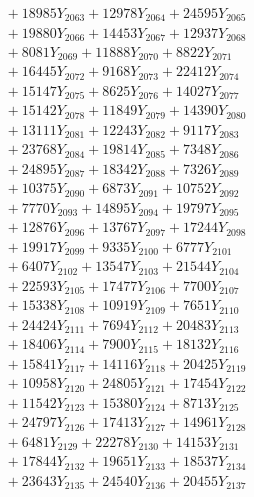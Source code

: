 \documentclass[a4paper,10pt]{article}
\begin{document}
{\begin{align}
&\;  + 18985 Y_{2063} + 12978 Y_{2064} + 24595 Y_{2065} \\[0.3ex]
&\;  + 19880 Y_{2066} + 14453 Y_{2067} + 12937 Y_{2068} \\[0.5ex]\allowbreak
&\;  + 8081 Y_{2069} + 11888 Y_{2070} + 8822 Y_{2071} \\[0.3ex]
&\;  + 16445 Y_{2072} + 9168 Y_{2073} + 22412 Y_{2074} \\[0.3ex]
&\;  + 15147 Y_{2075} + 8625 Y_{2076} + 14027 Y_{2077} \\[0.3ex]
&\;  + 15142 Y_{2078} + 11849 Y_{2079} + 14390 Y_{2080} \\[0.3ex]
&\;  + 13111 Y_{2081} + 12243 Y_{2082} + 9117 Y_{2083} \\[0.3ex]
&\;  + 23768 Y_{2084} + 19814 Y_{2085} + 7348 Y_{2086} \\[0.3ex]
&\;  + 24895 Y_{2087} + 18342 Y_{2088} + 7326 Y_{2089} \\[0.3ex]
&\;  + 10375 Y_{2090} + 6873 Y_{2091} + 10752 Y_{2092} \\[0.3ex]
&\;  + 7770 Y_{2093} + 14895 Y_{2094} + 19797 Y_{2095} \\[0.3ex]
&\;  + 12876 Y_{2096} + 13767 Y_{2097} + 17244 Y_{2098} \\[0.5ex]\allowbreak
&\;  + 19917 Y_{2099} + 9335 Y_{2100} + 6777 Y_{2101} \\[0.3ex]
&\;  + 6407 Y_{2102} + 13547 Y_{2103} + 21544 Y_{2104} \\[0.3ex]
&\;  + 22593 Y_{2105} + 17477 Y_{2106} + 7700 Y_{2107} \\[0.3ex]
&\;  + 15338 Y_{2108} + 10919 Y_{2109} + 7651 Y_{2110} \\[0.3ex]
&\;  + 24424 Y_{2111} + 7694 Y_{2112} + 20483 Y_{2113} \\[0.3ex]
&\;  + 18406 Y_{2114} + 7900 Y_{2115} + 18132 Y_{2116} \\[0.3ex]
&\;  + 15841 Y_{2117} + 14116 Y_{2118} + 20425 Y_{2119} \\[0.3ex]
&\;  + 10958 Y_{2120} + 24805 Y_{2121} + 17454 Y_{2122} \\[0.3ex]
&\;  + 11542 Y_{2123} + 15380 Y_{2124} + 8713 Y_{2125} \\[0.3ex]
&\;  + 24797 Y_{2126} + 17413 Y_{2127} + 14961 Y_{2128} \\[0.5ex]\allowbreak
&\;  + 6481 Y_{2129} + 22278 Y_{2130} + 14153 Y_{2131} \\[0.3ex]
&\;  + 17844 Y_{2132} + 19651 Y_{2133} + 18537 Y_{2134} \\[0.3ex]
&\;  + 23643 Y_{2135} + 24540 Y_{2136} + 20455 Y_{2137} \\[0.3ex]

\end{align}}
\end{document}
